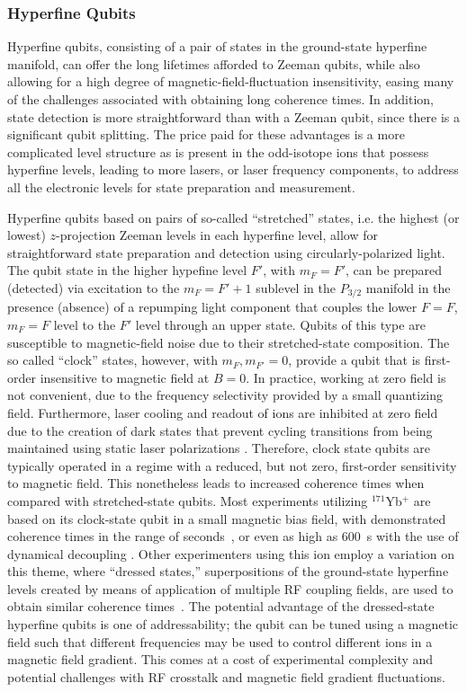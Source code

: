 \documentclass[%
reprint,
 amsmath,amssymb,
]{revtex4-1}
\begin{document}
\subsubsection{Hyperfine Qubits}

Hyperfine qubits, consisting of a pair of states in the ground-state hyperfine manifold, can offer the long lifetimes afforded to Zeeman qubits, while also allowing for a high degree of magnetic-field-fluctuation insensitivity, easing many of the challenges associated with obtaining long coherence times.  In addition, state detection is more straightforward than with a Zeeman qubit, since there is a significant qubit splitting.  The price paid for these advantages is a more complicated level structure as is present in the odd-isotope ions that possess hyperfine levels, leading to more lasers, or laser frequency components, to address all the electronic levels for state preparation and measurement.

Hyperfine qubits based on pairs of so-called ``stretched'' states, i.e. the highest (or lowest) $z$-projection Zeeman levels in each hyperfine level, allow for straightforward state preparation and detection using circularly-polarized light.  The qubit state in the higher hypefine level $F'$, with $m_{F}=F'$, can be prepared (detected) via excitation to the $m_{F}=F'+1$ sublevel in the $P_{3/2}$ manifold in the presence (absence) of a repumping light component that couples the lower $F=F$, $m_{F}=F$ level to the $F'$ level through an upper state.  Qubits of this type are susceptible to magnetic-field noise due to their stretched-state composition.  The so called ``clock'' states, however, with $m_{F},m_{F'}=0$, provide a qubit that is first-order insensitive to magnetic field at $B=0$.  In practice, working at zero field is not convenient, due to the frequency selectivity provided by a small quantizing field.  Furthermore, laser cooling and readout of ions are inhibited at zero field due to the creation of dark states that prevent cycling transitions from being maintained using static laser polarizations \cite{BerkelandDarkStates2002}. Therefore, clock state qubits are typically operated in a regime with a reduced, but not zero, first-order sensitivity to magnetic field.  This nonetheless leads to increased coherence times when compared with stretched-state qubits.  Most experiments utilizing $^{171}$Yb$^{+}$ are based on its clock-state qubit in a small magnetic bias field, with demonstrated coherence times in the range of seconds~\cite{PhysRevA.76.052314}, or even as high as 600~s with the use of dynamical decoupling \cite{Wang10MinuteCoherence2017}.  Other experimenters using this ion employ a variation on this theme, where ``dressed states,'' superpositions of the ground-state hyperfine levels created by means of application of multiple RF coupling fields, are used to obtain similar coherence times~\cite{Timoney2011,PhysRevLett.111.140501}.  The potential advantage of the dressed-state hyperfine qubits is one of addressability; the qubit can be tuned using a magnetic field such that different frequencies may be used to control different ions in a magnetic field gradient.  This comes at a cost of experimental complexity and potential challenges with RF crosstalk and magnetic field gradient fluctuations.
\end{document}
